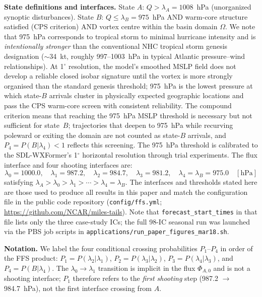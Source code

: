 \documentclass[11pt]{article}
\begin{document}
\textbf{State definitions and interfaces.}
State $A$: $Q > \lambda_A = 1008$~hPa (unorganized synoptic disturbances).
State $B$: $Q \leq \lambda_B = 975$~hPa AND warm-core structure satisfied (CPS criterion)
AND vortex centre within the basin domain $\Omega$.
We note that 975~hPa corresponds to tropical storm to minimal hurricane intensity and is
\textit{intentionally stronger} than the conventional NHC tropical storm genesis designation
($\sim$34~kt, roughly 997--1003~hPa in typical Atlantic pressure--wind relationships).
At 1$^\circ$ resolution, the model's smoothed MSLP field does not develop a reliable closed
isobar signature until the vortex is more strongly organised than the standard genesis threshold;
975~hPa is the lowest pressure at which state-$B$ arrivals cluster in physically expected
geographic locations and pass the CPS warm-core screen with consistent reliability.
The compound criterion means that reaching the 975~hPa MSLP threshold is necessary but not sufficient
for state~$B$; trajectories that deepen to 975~hPa while recurving poleward or exiting the domain
are not counted as state-$B$ arrivals, and $P_4 = P(B|\lambda_4) < 1$ reflects this screening.
The 975~hPa threshold is calibrated to the SDL-WXFormer's 1$^\circ$ horizontal
resolution through trial experiments.
The flux interface and four shooting interfaces are:
\begin{equation*}
\lambda_0 = 1000.0,\quad
\lambda_1 = 987.2,\quad
\lambda_2 = 984.7,\quad
\lambda_3 = 981.2,\quad
\lambda_4 = \lambda_B = 975.0 \quad [\text{hPa}]
\end{equation*}
satisfying $\lambda_A > \lambda_0 > \lambda_1 > \cdots > \lambda_4 = \lambda_B$.
The interfaces and thresholds stated here are those used to produce all results in this paper
and match the configuration file in the public code repository
(\texttt{config/ffs.yml}; \url{https://github.com/NCAR/miles-tails}).
Note that \texttt{forecast\_start\_times} in that file lists only the three case-study ICs;
the full 98-IC seasonal run was launched via the PBS job scripts in
\texttt{applications/run\_paper\_figures\_mar18.sh}.

\textbf{Notation.}
We label the four conditional crossing probabilities $P_1$--$P_4$ in order of the
FFS product: $P_1 = P(\lambda_2|\lambda_1)$, $P_2 = P(\lambda_3|\lambda_2)$,
$P_3 = P(\lambda_4|\lambda_3)$, and $P_4 = P(B|\lambda_4)$.
The $\lambda_0\to\lambda_1$ transition is implicit in the flux $\Phi_{A,0}$ and is
not a shooting interface; $P_1$ therefore refers to the \textit{first shooting} step
(987.2 $\to$ 984.7~hPa), not the first interface crossing from $A$.
\end{document}
